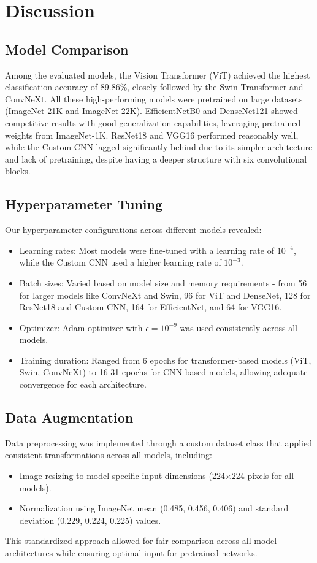 \documentclass[11pt]{article}
\begin{document}
\section{Discussion}

\subsection*{Model Comparison}
Among the evaluated models, the Vision Transformer (ViT) achieved the highest classification accuracy of 89.86\%, closely followed by the Swin Transformer and ConvNeXt. All these high-performing models were pretrained on large datasets (ImageNet-21K and ImageNet-22K). EfficientNetB0 and DenseNet121 showed competitive results with good generalization capabilities, leveraging pretrained weights from ImageNet-1K. ResNet18 and VGG16 performed reasonably well, while the Custom CNN lagged significantly behind due to its simpler architecture and lack of pretraining, despite having a deeper structure with six convolutional blocks.

\subsection*{Hyperparameter Tuning}
Our hyperparameter configurations across different models revealed:
\begin{itemize}
    \item Learning rates: Most models were fine-tuned with a learning rate of $10^{-4}$, while the Custom CNN used a higher learning rate of $10^{-3}$.
    \item Batch sizes: Varied based on model size and memory requirements - from 56 for larger models like ConvNeXt and Swin, 96 for ViT and DenseNet, 128 for ResNet18 and Custom CNN, 164 for EfficientNet, and 64 for VGG16.
    \item Optimizer: Adam optimizer with $\epsilon=10^{-9}$ was used consistently across all models.
    \item Training duration: Ranged from 6 epochs for transformer-based models (ViT, Swin, ConvNeXt) to 16-31 epochs for CNN-based models, allowing adequate convergence for each architecture.
\end{itemize}

\subsection*{Data Augmentation}
Data preprocessing was implemented through a custom dataset class that applied consistent transformations across all models, including:
\begin{itemize}
    \item Image resizing to model-specific input dimensions (224×224 pixels for all models).
    \item Normalization using ImageNet mean (0.485, 0.456, 0.406) and standard deviation (0.229, 0.224, 0.225) values.
\end{itemize}
This standardized approach allowed for fair comparison across all model architectures while ensuring optimal input for pretrained networks.
\end{document}
